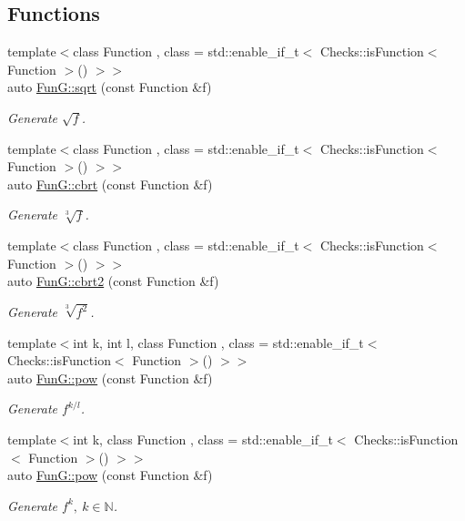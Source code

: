 \subsection*{Functions}
\begin{DoxyCompactItemize}
\item 
{\footnotesize template$<$class Function , class  = std\+::enable\+\_\+if\+\_\+t$<$ Checks\+::is\+Function$<$ Function $>$() $>$$>$ }\\auto \hyperlink{group__CMathGroup_ga136c890475e48f88469a737d95368d05}{Fun\+G\+::sqrt} (const Function \&f)
\begin{DoxyCompactList}\small\item\em Generate $ \sqrt{f} $. \end{DoxyCompactList}\item 
{\footnotesize template$<$class Function , class  = std\+::enable\+\_\+if\+\_\+t$<$ Checks\+::is\+Function$<$ Function $>$() $>$$>$ }\\auto \hyperlink{group__CMathGroup_gaa7f2552adfb8ec41aeb685adddd8bf98}{Fun\+G\+::cbrt} (const Function \&f)
\begin{DoxyCompactList}\small\item\em Generate $ \sqrt[3]{f} $. \end{DoxyCompactList}\item 
{\footnotesize template$<$class Function , class  = std\+::enable\+\_\+if\+\_\+t$<$ Checks\+::is\+Function$<$ Function $>$() $>$$>$ }\\auto \hyperlink{group__CMathGroup_gafd27322fb64c6df3366f384c93819a06}{Fun\+G\+::cbrt2} (const Function \&f)
\begin{DoxyCompactList}\small\item\em Generate $ \sqrt[3]{f^2}$. \end{DoxyCompactList}\item 
{\footnotesize template$<$int k, int l, class Function , class  = std\+::enable\+\_\+if\+\_\+t$<$ Checks\+::is\+Function$<$ Function $>$() $>$$>$ }\\auto \hyperlink{group__CMathGroup_gaecae6fa60bbfc0eb1867581ee4577d4e}{Fun\+G\+::pow} (const Function \&f)
\begin{DoxyCompactList}\small\item\em Generate $ f^{k/l} $. \end{DoxyCompactList}\item 
{\footnotesize template$<$int k, class Function , class  = std\+::enable\+\_\+if\+\_\+t$<$ Checks\+::is\+Function$<$ Function $>$() $>$$>$ }\\auto \hyperlink{group__CMathGroup_gab52ffe2efd379aad7ea322de46103465}{Fun\+G\+::pow} (const Function \&f)
\begin{DoxyCompactList}\small\item\em Generate $ f^k,\ k\in\mathbb{N}$. \end{DoxyCompactList}\end{DoxyCompactItemize}
